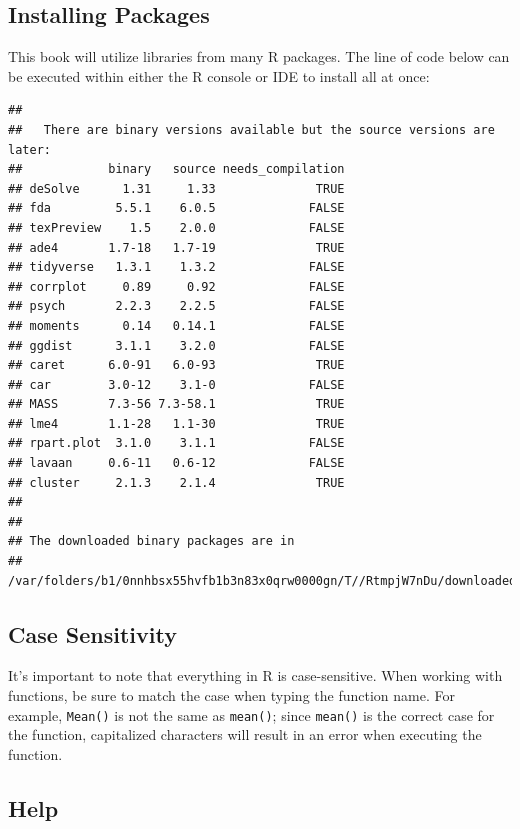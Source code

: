 \documentclass[
]{book}
\begin{document}
\hypertarget{installing-packages}{%
\subsection{Installing Packages}\label{installing-packages}}

This book will utilize libraries from many R packages. The line of code below can be executed within either the R console or IDE to install all at once:

\begin{verbatim}
## 
##   There are binary versions available but the source versions are later:
##            binary   source needs_compilation
## deSolve      1.31     1.33              TRUE
## fda         5.5.1    6.0.5             FALSE
## texPreview    1.5    2.0.0             FALSE
## ade4       1.7-18   1.7-19              TRUE
## tidyverse   1.3.1    1.3.2             FALSE
## corrplot     0.89     0.92             FALSE
## psych       2.2.3    2.2.5             FALSE
## moments      0.14   0.14.1             FALSE
## ggdist      3.1.1    3.2.0             FALSE
## caret      6.0-91   6.0-93              TRUE
## car        3.0-12    3.1-0             FALSE
## MASS       7.3-56 7.3-58.1              TRUE
## lme4       1.1-28   1.1-30              TRUE
## rpart.plot  3.1.0    3.1.1             FALSE
## lavaan     0.6-11   0.6-12             FALSE
## cluster     2.1.3    2.1.4              TRUE
## 
## 
## The downloaded binary packages are in
##  /var/folders/b1/0nnhbsx55hvfb1b3n83x0qrw0000gn/T//RtmpjW7nDu/downloaded_packages
\end{verbatim}

\hypertarget{case-sensitivity}{%
\subsection{Case Sensitivity}\label{case-sensitivity}}

It's important to note that everything in R is case-sensitive. When working with functions, be sure to match the case when typing the function name. For example, \texttt{Mean()} is not the same as \texttt{mean()}; since \texttt{mean()} is the correct case for the function, capitalized characters will result in an error when executing the function.

\hypertarget{help}{%
\subsection{Help}\label{help}}
\end{document}
